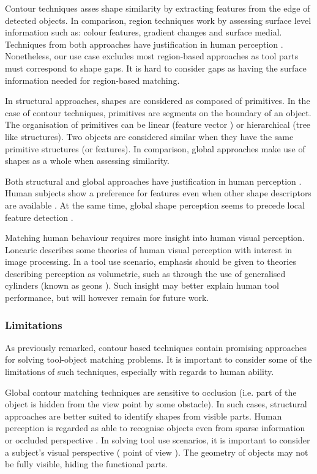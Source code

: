 \documentclass[
    floatsintext
]{article}
\begin{document}
Contour techniques asses shape similarity by extracting features from the edge of detected objects.
In comparison, region techniques work by assessing surface level information such as: colour features, gradient changes and surface medial.
Techniques from both approaches have justification in human perception \cite{chatbri2016}.
Nonetheless, our use case excludes most region-based approaches as tool parts must correspond to shape gaps.
It is hard to consider gaps as having the surface information needed for region-based matching.

In structural approaches, shapes are considered as composed of primitives. In the case of contour techniques, primitives are segments on the boundary of an object.
The organisation of primitives can be linear (feature vector \cite{zhang2004}) or hierarchical (tree like structures\cite{zhu2015}).
Two objects are considered similar when they have the same primitive structures (or features).
In comparison, global approaches make use of shapes as a whole when assessing similarity. 

Both structural and global approaches have justification in human perception \cite{zhang2004}.
Human subjects show a preference for features even when other shape descriptors are available \cite{chatbri2016}.
At the same time, global shape perception seems to precede local feature detection \cite{navon1977}. 

Matching human behaviour requires more insight into human visual perception.
Loncaric \cite{loncaric1998} describes some theories of human visual perception with interest in image processing.
In a tool use scenario, emphasis should be given to theories describing perception as volumetric, such as through the use of generalised cylinders (known as geons \cite{dickinson2014}).
Such insight may better explain human tool performance, but will however remain for future work.    

\subsubsection{Limitations}
As previously remarked, contour based techniques contain promising approaches for solving tool-object matching problems.
It is important to consider some of the limitations of such techniques, especially with regards to human ability. 

Global contour matching techniques are sensitive to occlusion (i.e. part of the object is hidden from the view point by some obstacle).
In such cases, structural approaches are better suited to identify shapes from visible parts.
Human perception is regarded as able to recognise objects even from sparse information or occluded perspective \cite{loncaric1998}.
In solving tool use scenarios, it is important to consider a subject's visual perspective ( point of view ).
The geometry of objects may not be fully visible, hiding the functional parts.
\end{document}

